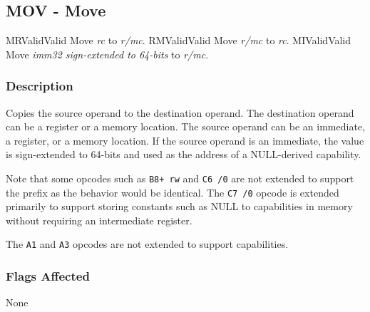 \clearpage
{}
{}
\subsection*{MOV - Move}

\begin{x86opcodetable}
  {MR}{Valid}{Valid}
  {Move \emph{rc} to \emph{r/mc}.}
  {RM}{Valid}{Valid}
  {Move \emph{r/mc} to \emph{rc}.}
  {MI}{Valid}{Valid}
  {Move \emph{imm32 sign-extended to 64-bits} to \emph{r/mc}.}
\end{x86opcodetable}

\begin{x86opentable}
\end{x86opentable}

\subsubsection*{Description}

Copies the source operand to the destination operand. The destination
operand can be a register or a memory location. The source operand can
be an immediate, a register, or a memory location.  If the source
operand is an immediate, the value is sign-extended to 64-bits and
used as the address of a NULL-derived capability.

Note that some  opcodes such as \texttt{B8+ rw} and
\texttt{C6 /0} are not extended to support the  prefix
as the behavior would be identical.  The \texttt{C7 /0} opcode is
extended primarily to support storing constants such as NULL to
capabilities in memory without requiring an intermediate register.

The \texttt{A1} and \texttt{A3} opcodes are not extended to support
capabilities.

\subsubsection*{Flags Affected}

None
